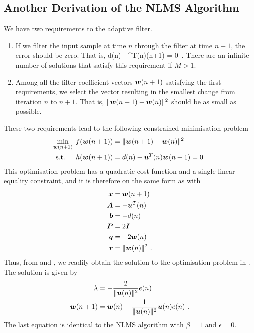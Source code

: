 \subsection{Another Derivation of the NLMS Algorithm}
We have two requirements to the adaptive filter.
\begin{enumerate}
  \item If we filter the input sample at time $n$ through the filter at time $n+1$, the error should be zero. That is,
  \bmath
    d(n) - ^T(n)(n+1) = 0\ .
  \emath
  There are an infinite number of solutions that satisfy this requirement if $M>1$.
  \item Among all the filter coefficient vectors $\boldsymbol{w}(n+1)$ satisfying the first requirements, we select the vector resulting in the smallest change from iteration $n$ to $n+1$. That is, $\|\boldsymbol{w}(n+1)-\boldsymbol{w}(n)\|^2$ should be as small as possible.
\end{enumerate}
These two requirements lead to the following constrained minimisation problem
\begin{gather}
  \begin{alignedat}{2}
      &\min_{\mathclap{\vect{w}(n+1)}} &\quad f(\vect{w}(n+1))&=\|\vect{w}(n+1)-\vect{w}(n)\|^2\\
      &\text{s.t.}&\quad h(\vect{w}(n+1)) &= d(n) - \vect{u}^T(n)\vect{w}(n+1) = 0
  \end{alignedat}
  \label{eq:nlms_opt}
\end{gather}
This optimisation problem has a quadratic cost function and a single linear equality constraint, and it is therefore on the same form as  with
\begin{align}
  \boldsymbol{x} &= \boldsymbol{w}(n+1)\\
  \boldsymbol{A} &= -\boldsymbol{u}^T(n)\\
  \boldsymbol{b} &= -d(n)\\
  \boldsymbol{P} &= 2\boldsymbol{I}\\
  \boldsymbol{q} &= -2\boldsymbol{w}(n)\\
  \boldsymbol{r} &= \|\boldsymbol{w}(n)\|^2\ .
\end{align}
Thus, from  and , we readily obtain the solution to the optimisation problem in . The solution is given by
\begin{align}
  \lambda &= -\frac{2}{\|\boldsymbol{u}(n)\|^2}e(n)\\
  \boldsymbol{w}(n+1) &= \boldsymbol{w}(n)+\frac{1}{\|\boldsymbol{u}(n)\|^2}\boldsymbol{u}(n)e(n)\ .
\end{align}
The last equation is identical to the NLMS algorithm with $\beta=1$ and $\epsilon=0$.

